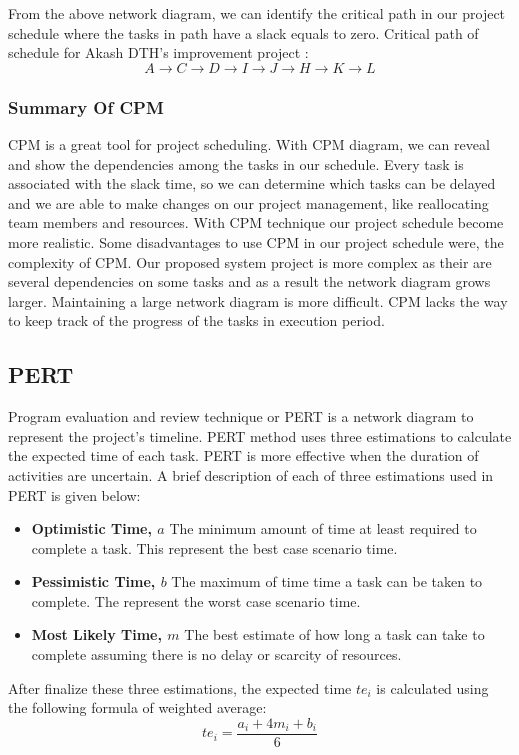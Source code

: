 \begin{spacing}{1}
From the above network diagram, we can identify the critical path in our project schedule where the tasks in path have a slack equals to zero. Critical path of schedule for Akash DTH's improvement project : \newline
\[ A \to C \to D \to I \to J \to H \to K \to L \]

\subsubsection{Summary Of CPM}  
CPM is a great tool for project scheduling. With CPM diagram, we can reveal and show the dependencies among the tasks in our schedule. Every task is associated with the slack time, so we can determine which tasks can be delayed and we are able to make changes on our project management, like reallocating team members and resources. With CPM technique our project schedule become more realistic.
Some disadvantages to use CPM in our project schedule were, the complexity of CPM. Our proposed system project is more complex as their are several dependencies on some tasks and as a result the network diagram grows larger. Maintaining a large network diagram is more difficult. CPM lacks the way to keep track of the progress of the tasks in execution period. 

\subsection{PERT}
Program evaluation and review technique or PERT is a network diagram to represent the project's timeline. PERT method uses three estimations to calculate the expected time of each task. PERT is more effective when the duration of activities are uncertain. A brief description of each of three estimations used in PERT is given below:
\begin{itemize}
	\item \textbf{Optimistic Time, $a$} The minimum amount of time at least required to complete a task. This represent the best case scenario time.
	\item \textbf{Pessimistic Time, $b$} The maximum of time time a task can be taken to complete. The represent the worst case scenario time.
	\item \textbf{Most Likely Time, $m$} The best estimate of how long a task can take to complete assuming there is no delay or scarcity of resources.
\end{itemize} 

After finalize these three estimations, the expected time $te_{i}$ is calculated using the following formula of weighted average: \newline
\begin{equation}
te_{i} = \frac{a_i + 4m_i + b_i}{6} 
\end{equation}


\end{spacing}
